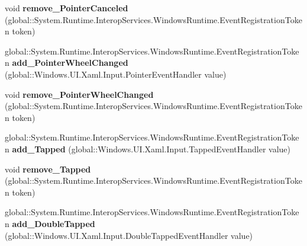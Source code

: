 \begin{DoxyCompactItemize}
\item 
\mbox{\label{interface_windows_1_1_u_i_1_1_xaml_1_1_i_u_i_element_ac9b592ea4f90c7a92f1def7811d1d96f}} 
void {\bfseries remove\+\_\+\+Pointer\+Canceled} (global\+::\+System.\+Runtime.\+Interop\+Services.\+Windows\+Runtime.\+Event\+Registration\+Token token)
\item 
\mbox{\label{interface_windows_1_1_u_i_1_1_xaml_1_1_i_u_i_element_a2716b15da4333bb063c9bc09c373340f}} 
global\+::\+System.\+Runtime.\+Interop\+Services.\+Windows\+Runtime.\+Event\+Registration\+Token {\bfseries add\+\_\+\+Pointer\+Wheel\+Changed} (global\+::\+Windows.\+U\+I.\+Xaml.\+Input.\+Pointer\+Event\+Handler value)
\item 
\mbox{\label{interface_windows_1_1_u_i_1_1_xaml_1_1_i_u_i_element_abfc60dbc7d299bf2692903f393ed810f}} 
void {\bfseries remove\+\_\+\+Pointer\+Wheel\+Changed} (global\+::\+System.\+Runtime.\+Interop\+Services.\+Windows\+Runtime.\+Event\+Registration\+Token token)
\item 
\mbox{\label{interface_windows_1_1_u_i_1_1_xaml_1_1_i_u_i_element_a991022bdcf7af68dd9c2bf3964b3bb14}} 
global\+::\+System.\+Runtime.\+Interop\+Services.\+Windows\+Runtime.\+Event\+Registration\+Token {\bfseries add\+\_\+\+Tapped} (global\+::\+Windows.\+U\+I.\+Xaml.\+Input.\+Tapped\+Event\+Handler value)
\item 
\mbox{\label{interface_windows_1_1_u_i_1_1_xaml_1_1_i_u_i_element_a10d8b2df3301a8687ac2a02dbf56e6ad}} 
void {\bfseries remove\+\_\+\+Tapped} (global\+::\+System.\+Runtime.\+Interop\+Services.\+Windows\+Runtime.\+Event\+Registration\+Token token)
\item 
\mbox{\label{interface_windows_1_1_u_i_1_1_xaml_1_1_i_u_i_element_a236a917ea08d09ceea39e12f03cbe17f}} 
global\+::\+System.\+Runtime.\+Interop\+Services.\+Windows\+Runtime.\+Event\+Registration\+Token {\bfseries add\+\_\+\+Double\+Tapped} (global\+::\+Windows.\+U\+I.\+Xaml.\+Input.\+Double\+Tapped\+Event\+Handler value)
\item 

\end{DoxyCompactItemize}
